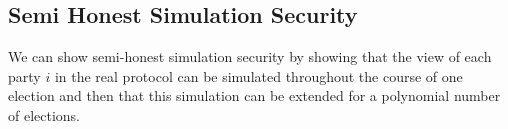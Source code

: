 \subsection{Semi Honest Simulation Security}


We can show semi-honest simulation security by showing that the view of each party $i$ in the real protocol
can be simulated throughout the course of one election and then that this simulation can be extended for a polynomial number of elections.

\newcommand{\totalReg}{\overline{n}}
\newcommand{\totalRev}{\overline{k}}

\newcommand{\simIMSLE}{\texttt{Sim}_i}


